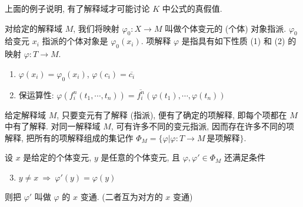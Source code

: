 \documentclass[
    color=black,
    device=normal,
    lang=cn
]{elegantnote}
\begin{document}
上面的例子说明, 有了解释域才可能讨论 $K$ 中公式的真假值.
\begin{definition}[项解释]
    对给定的解释域 $M$, 我们将映射 $\varphi_0: X\to M$ 叫做个体变元的 (个体) 对象指派. $\varphi_0$ 给变元 $x_i$ 指派的个体对象是 $\varphi_0(x_i)$. 项解释 $\varphi$ 是指具有如下性质 (1) 和 (2) 的映射 $\varphi: T\to M$.
    \begin{enumerate}[(1)]
        \item $\varphi(x_i)=\varphi_0(x_i)$, $\varphi(c_i)=\overline{c_i}$
        \item 保运算性: $\varphi(f_i^n(t_1, \cdots, t_n))=\overline{f_i^n}(\varphi(t_1), \cdots, \varphi(t_n))$
    \end{enumerate}
\end{definition}
给定解释域 $M$, 只要变元有了解释 (指派), 便有了确定的项解释, 即每个项都在 $M$ 中有了解释. 对同一解释域 $M$, 可有许多不同的变元指派, 因而存在许多不同的项解释, 把所有的项解释组成的集记作 $\Phi_M = \{\varphi\vert\varphi:T\to M\ \text{是项解释}\}$.
\begin{definition}[项解释的变元变通]
    设 $x$ 是给定的个体变元, $y$ 是任意的个体变元, 且 $\varphi, \varphi'\in\Phi_M$ 还满足条件
    \begin{enumerate}[(1)]\setcounter{enumi}{2}
        \item $y\neq x\ \Rightarrow\  \varphi'(y)=\varphi(y)$
    \end{enumerate}
    则把 $\varphi'$ 叫做 $\varphi$ 的 $x$ 变通. (二者互为对方的 $x$ 变通)
\end{definition}
\end{document}

